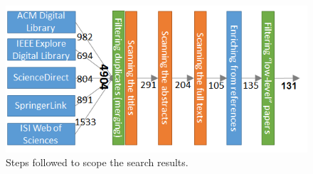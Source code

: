 \documentclass[PhD, Submit, ngerman,UKenglish,table]{scrbook}
\begin{document}
\begin{figure}
\centering
\includegraphics[scale=1]{images/papers_filtering.png}
\caption{Steps followed to scope the search results.}
\label{fig:papers_filtering}
\end{figure}
\end{document}
